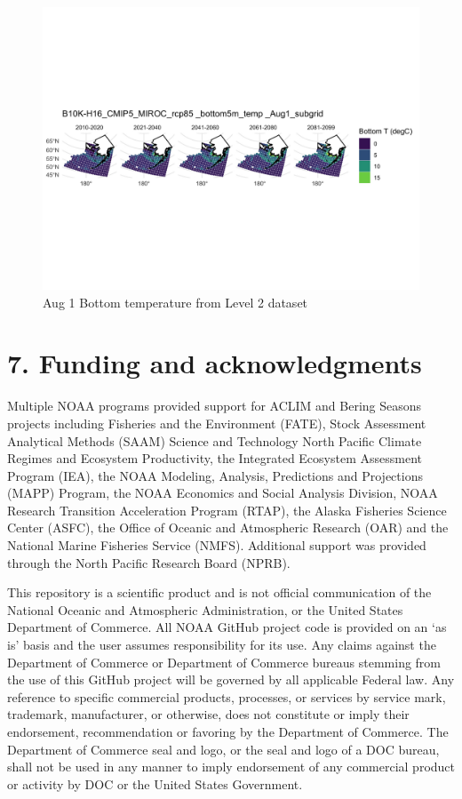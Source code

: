 \documentclass[
]{article}
\begin{document}
\begin{figure}
\centering
\includegraphics[width=1\textwidth,height=\textheight]{Figs/sub_grid_mn_BT_Aug1.jpg}
\caption{Aug 1 Bottom temperature from Level 2 dataset}
\end{figure}

\hypertarget{funding-and-acknowledgments}{%
\section{7. Funding and
acknowledgments}\label{funding-and-acknowledgments}}

Multiple NOAA programs provided support for ACLIM and Bering Seasons
projects including Fisheries and the Environment (FATE), Stock
Assessment Analytical Methods (SAAM) Science and Technology North
Pacific Climate Regimes and Ecosystem Productivity, the Integrated
Ecosystem Assessment Program (IEA), the NOAA Modeling, Analysis,
Predictions and Projections (MAPP) Program, the NOAA Economics and
Social Analysis Division, NOAA Research Transition Acceleration Program
(RTAP), the Alaska Fisheries Science Center (ASFC), the Office of
Oceanic and Atmospheric Research (OAR) and the National Marine Fisheries
Service (NMFS). Additional support was provided through the North
Pacific Research Board (NPRB).

This repository is a scientific product and is not official
communication of the National Oceanic and Atmospheric Administration, or
the United States Department of Commerce. All NOAA GitHub project code
is provided on an `as is' basis and the user assumes responsibility for
its use. Any claims against the Department of Commerce or Department of
Commerce bureaus stemming from the use of this GitHub project will be
governed by all applicable Federal law. Any reference to specific
commercial products, processes, or services by service mark, trademark,
manufacturer, or otherwise, does not constitute or imply their
endorsement, recommendation or favoring by the Department of Commerce.
The Department of Commerce seal and logo, or the seal and logo of a DOC
bureau, shall not be used in any manner to imply endorsement of any
commercial product or activity by DOC or the United States Government.
\end{document}
